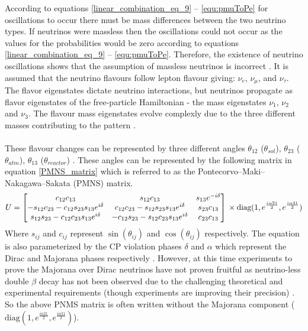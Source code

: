 According to equations \ref{linear_combination_eq_9} -- \ref{equ:pmuToPe} for oscillations to occur there must be mass differences between the two neutrino types. If neutrinos were massless then the oscillations could not occur as the values for the probabilities would be zero according to equations \ref{linear_combination_eq_9} -- \ref{equ:pmuToPe}. Therefore, the existence of neutrino oscillations shows that the assumption of massless neutrinos is incorrect \cite{griffiths2008neutrinoOscillations} \cite{sassaroli1999neutrino}. It is assumed that the neutrino flavours follow lepton flavour giving: $\nu_e$, $\nu_\mu$, and $\nu_\tau$. The flavor eigenstates dictate neutrino interactions, but neutrinos propagate as flavor eigenstates of the free-particle Hamiltonian - the mass eigenstates $\nu_1$, $\nu_2$ and $\nu_3$. The flavour mass eigenstates evolve complexly due to the three different masses contributing to the pattern   \cite{griffiths2008neutrinoOscillations}. 
\\\\These flavour changes can be represented by three different angles $\theta_{12}$ ($\theta_{sol}$), $\theta_{23}$ ($\theta_{atm}$), $\theta_{13}$ ($\theta_{reactor}$) \cite{Olive_2014}  \cite{griffiths2008neutrinoOscillations}. These angles can be represented by the following  matrix in equation \ref{PMNS_matrix} which is referred to as the Pontecorvo–Maki–Nakagawa–Sakata (PMNS) matrix.
\begin{equation}
U
    =
    \begin{bmatrix}
        c_{12}c_{13} & s_{12}c_{13} & s_{13}e^{-i\delta}\\
        -s_{12}c_{23} - c_{12}s_{23}s_{13}e^{i\delta} & c_{12}c_{23} - s_{12}s_{23}s_{13}e^{i\delta} & s_{23}c_{13} \\
        s_{12}s_{23} - c_{12}c_{23}s_{13}e^{i\delta} & -c_{12}s_{23} - s_{12}c_{23}s_{13}e^{i\delta} & c_{23}c_{13} 
    \end{bmatrix}
    \\ \times \text{diag}(1, e^{\frac{i\alpha21}{2}} , e^{\frac{i\alpha31}{2}})
    \label{PMNS_matrix}
\end{equation}
Where $s_{ij}$ and $c_{ij}$ represent $\sin(\theta_{ij})$ and $\cos(\theta_{ij})$ respectively. The equation is also parameterized by the CP violation phases $\delta$ and $\alpha$ which represent the Dirac and Majorana phases respectively \cite{Olive_2014}. However, at this time experiments to prove the Majorana over Dirac neutrinos have not proven fruitful as neutrino-less double $\beta$ decay has not been observed due to the challenging theoretical and experimental requirements (though experiments are improving their precision) \cite{Cardani_2019}.  So the above PNMS matrix is often written without the Majorana component ($\text{diag}(1, e^{\frac{i\alpha21}{2}} , e^{\frac{i\alpha31}{2}})$). 
